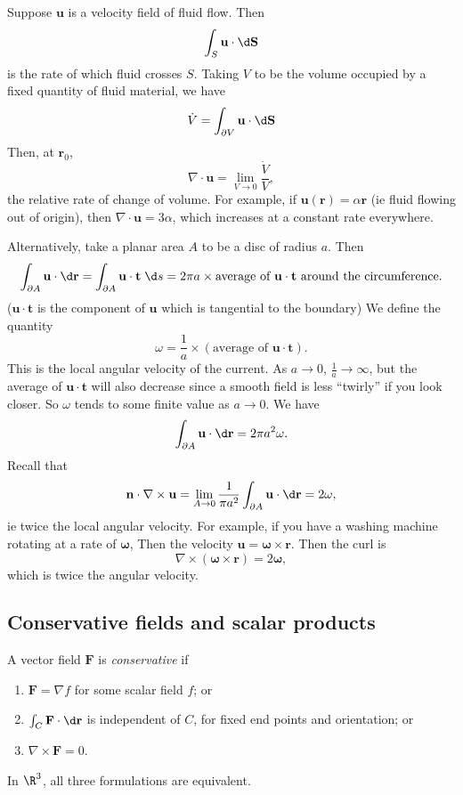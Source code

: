 \documentclass[a4paper]{article}
\begin{document}
\begin{eg}
  Suppose $\mathbf{u}$ is a velocity field of fluid flow. Then
  \[
    \int_S \mathbf{u}\cdot \d \mathbf{S}
  \]
  is the rate of which fluid crosses $S$. Taking $V$ to be the volume occupied by a fixed quantity of fluid material, we have
  \[
    \dot{V} = \int_{\partial V}\mathbf{u}\cdot \d \mathbf{S}
  \]
  Then, at $\mathbf{r}_0$,
  \[
    \nabla\cdot \mathbf{u} = \lim_{V\to 0}\frac{\dot{V}}{V},
  \]
  the relative rate of change of volume. For example, if $\mathbf{u}(\mathbf{r}) = \alpha\mathbf{r}$ (ie fluid flowing out of origin), then $\nabla\cdot \mathbf{u} = 3\alpha$, which increases at a constant rate everywhere.

  Alternatively, take a planar area $A$ to be a disc of radius $a$. Then
  \[
    \int_{\partial A}\mathbf{u}\cdot \d \mathbf{r} = \int_{\partial A}\mathbf{u}\cdot \mathbf{t} \;\d s = 2\pi a \times \text{average of $\mathbf{u}\cdot \mathbf{t}$ around the circumference}.
  \]
  ($\mathbf{u}\cdot \mathbf{t}$ is the component of $\mathbf{u}$ which is tangential to the boundary) We define the quantity
  \[
    \omega = \frac{1}{a} \times (\text{average of }\mathbf{u}\cdot \mathbf{t}).
  \]
  This is the local angular velocity of the current. As $a \to 0$, $\frac{1}{a} \to \infty$, but the average of $\mathbf{u}\cdot \mathbf{t}$ will also decrease since a smooth field is less ``twirly'' if you look closer. So $\omega$ tends to some finite value as $a\to 0$. We have
  \[
    \int_{\partial A} \mathbf{u}\cdot \d \mathbf{r} = 2\pi a^2 \omega.
  \]
  Recall that
  \[
    \mathbf{n}\cdot \nabla \times \mathbf{u} = \lim_{A \to 0}\frac{1}{\pi a^2}\int_{\partial A}\mathbf{u}\cdot \d \mathbf{r} = 2\omega,
  \]
  ie twice the local angular velocity. For example, if you have a washing machine rotating at a rate of $\boldsymbol\omega$, Then the velocity $\mathbf{u} = \boldsymbol\omega\times \mathbf{r}$. Then the curl is
  \[
    \nabla\times (\boldsymbol\omega\times \mathbf{r}) = 2\boldsymbol\omega,
  \]
  which is twice the angular velocity.
\end{eg}

\subsection{Conservative fields and scalar products}
\begin{defi}
  A vector field $\mathbf{F}$ is \emph{conservative} if
  \begin{enumerate}
    \item $\mathbf{F} = \nabla f$ for some scalar field $f$; or
    \item $\int_C \mathbf{F}\cdot \d \mathbf{r}$ is independent of $C$, for fixed end points and orientation; or
    \item $\nabla \times \mathbf{F} = 0$.
  \end{enumerate}
  In $\R^3$, all three formulations are equivalent.
\end{defi}
\end{document}
